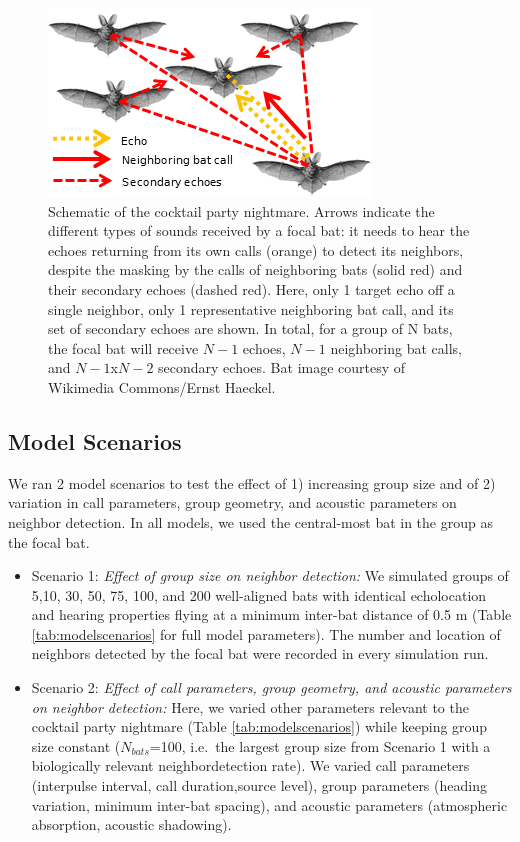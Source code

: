 \documentclass[
]{book}
\providecommand{\tightlist}{%
  \setlength{\itemsep}{0pt}\setlength{\parskip}{0pt}}
\begin{document}
\begin{figure}[!htbp]
\includegraphics[]{original_papers/CPN_figures/Figure_1/cpn_sounds_schematic_012.png}
\centering
\caption{Schematic of the cocktail party nightmare. Arrows indicate the different types of sounds received by a focal bat: it needs to hear the echoes returning from its own calls (orange) to detect its neighbors, despite the masking by the calls of neighboring bats (solid red) and their secondary echoes (dashed red). Here, only 1 target echo off a single neighbor, only 1 representative neighboring bat call, and its set of secondary echoes are shown. In total, for a group of N bats, the focal bat will receive $N-1$ echoes, $N-1$ neighboring bat calls, and $N-1$x$N-2$ secondary echoes. Bat image courtesy of Wikimedia Commons/Ernst Haeckel.}
\label{cpn_fig1}
\end{figure}

\hypertarget{model-scenarios}{%
\subsection{Model Scenarios}\label{model-scenarios}}

We ran 2 model scenarios to test the effect of 1) increasing group size and of 2) variation in call parameters, group geometry, and acoustic parameters on neighbor detection. In all models, we used the central-most bat in the group as the focal bat.

\begin{itemize}
\tightlist
\item
  Scenario 1: \emph{Effect of group size on neighbor detection:} We simulated groups of 5,10, 30, 50, 75, 100, and 200 well-aligned bats with identical echolocation and hearing properties flying at a minimum inter-bat distance of 0.5 m (Table \ref{tab:modelscenarios} for full model parameters). The number and location of neighbors detected by the focal bat were recorded in every simulation run.
\item
  Scenario 2: \emph{Effect of call parameters, group geometry, and acoustic parameters on neighbor detection:} Here, we varied other parameters relevant to the cocktail party nightmare (Table \ref{tab:modelscenarios}) while keeping group size constant (\(N_{bats}\)=100, i.e.~the largest group size from Scenario 1 with a biologically relevant neighbordetection rate). We varied call parameters (interpulse interval, call duration,source level), group parameters (heading variation, minimum inter-bat spacing), and acoustic parameters (atmospheric absorption, acoustic shadowing).
\end{itemize}
\end{document}
